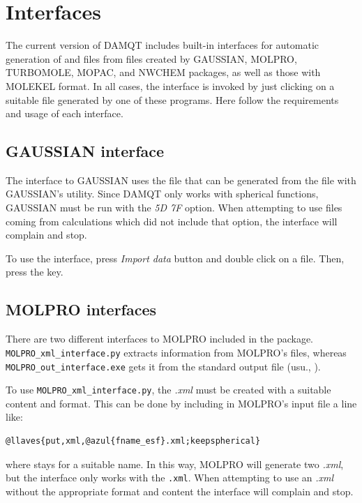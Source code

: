 \documentclass[10pt]{article}
\begin{document}
\section{Interfaces \label{sec:Interfaces}}

The current version of DAMQT includes built-in interfaces for automatic
generation of \den{ } and \ggbs{ } files from files created by
GAUSSIAN, MOLPRO, TURBOMOLE, MOPAC, and NWCHEM packages, as well as those with MOLEKEL format. 
In all cases, the
interface is invoked by just clicking on a suitable file generated by one of
these programs. Here follow the requirements and usage of each interface.


\subsection{GAUSSIAN interface \label{sec:5.1}}

The interface to GAUSSIAN uses the \fchk{ } file that can be generated from 
the \chk{ } file with GAUSSIAN's \formchk{ } utility.
Since DAMQT only works with spherical functions, GAUSSIAN must be run with
the {\it 5D 7F} option. When attempting to use files coming from calculations
which did not include that option, the interface will complain and stop.

To use the interface, press {\it Import data} button \teclapuntos and double click
on a \fchk{ } file. Then, press the \exec key.


\subsection{MOLPRO interfaces \label{sec:5.2}}

There are two different interfaces to MOLPRO included in the package. 
\texttt{MOLPRO\_xml\_interface.py} extracts information from MOLPRO's \xml{ } files, 
whereas \texttt{MOLPRO\_out\_interface.exe} gets it from the standard 
output file (usu., \out). 

To use \texttt{MOLPRO\_xml\_interface.py}, the {\it .xml} must be created
with a suitable content and format. This can be done by including in MOLPRO's input 
file a line like:

\begin{Verbatim}[frame=none,commandchars=\@\{\}]
@llaves{put,xml,@azul{fname_esf}.xml;keepspherical}
\end{Verbatim}

where  stays for a suitable name. In this way, MOLPRO will 
generate two 
{\it .xml}, but the interface only works with the \texttt{.xml}. When 
attempting to use an {\it .xml} without the appropriate format and content the 
interface will complain and stop.
\end{document}
